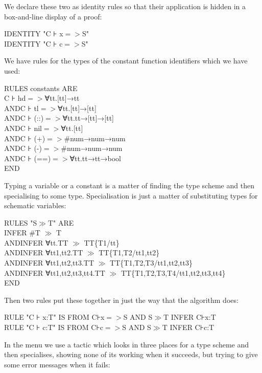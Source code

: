 \documentclass[11pt]{book}
\newcommand{\tab}{\hspace{5mm}}
\begin{document}
We declare these two as identity rules so that their application is hidden in a box-and-line display of a proof:

IDENTITY "C ⊦ x$=>$S"\\
IDENTITY "C ⊦ c$=>$S"


We have rules for the types of the constant function identifiers which we have used:

RULES constants ARE\\
\tab C ⊦ hd$=>$∀tt.[tt]→tt\\
AND\tab C ⊦ tl$=>$∀tt.[tt]→[tt]\\
AND\tab C ⊦ (::)$=>$∀tt.tt→[tt]→[tt]\\
AND\tab C ⊦ nil$=>$∀tt.[tt]\\
AND\tab C ⊦ (+)$=>$\#num→num→num\\
AND\tab C ⊦ (-)$=>$\#num→num→num\\
AND\tab C ⊦ (==)$=>$∀tt.tt→tt→bool\\
END


Typing a variable or a constant is a matter of finding the type scheme and then specialising to some type. Specialisation is just a matter of substituting types for schematic variables:

RULES "S$\gg$T" ARE\\
\tab INFER \#T $\gg$ T\\
AND\tab INFER ∀tt.TT $\gg$ TT\{T1/tt\}\\
AND\tab INFER ∀tt1,tt2.TT $\gg$ TT\{T1,T2/tt1,tt2\}\\
AND\tab INFER ∀tt1,tt2,tt3.TT $\gg$ TT\{T1,T2,T3/tt1,tt2,tt3\}\\
AND\tab INFER ∀tt1,tt2,tt3,tt4.TT $\gg$ TT\{T1,T2,T3,T4/tt1,tt2,tt3,tt4\}\\
END


Then two rules put these together in just the way that the algorithm does:

RULE "C ⊦ x:T" IS FROM C⊦x$=>$S AND S$\gg$T INFER C⊦x:T\\
RULE "C ⊦ c:T" IS FROM C⊦c$=>$S AND S$\gg$T INFER C⊦c:T


In the menu we use a tactic which looks in three places for a type scheme and then specialises, showing none of its working when it succeeds, but trying to give some error messages when it fails:
\end{document}

